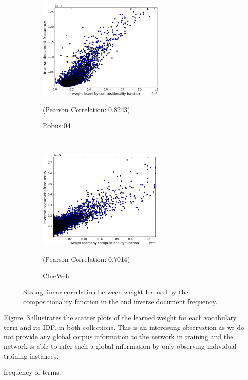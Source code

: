 \begin{figure}[!t]%
    \centering
    \begin{subfigure}[t]{0.45\textwidth}
        \centering
        \includegraphics[height=5cm]{03-part-02/chapter-04/figs_and_tables/plot_composionality_idf_scatter_robust.png}
        \caption{\label{fig:scatter_r}Robust04}{\scriptsize{(Pearson Correlation: 0.8243)}}
    \end{subfigure}%
    ~
    \begin{subfigure}[t]{0.45\textwidth}
        \centering
        \includegraphics[height=5cm]{03-part-02/chapter-04/figs_and_tables/plot_composionality_idf_scatter_clueweb.png}
        \caption{\label{fig:scatter_c}ClueWeb}{\scriptsize{(Pearson Correlation: 0.7014)}}
    \end{subfigure}%
    \caption{\label{fig:scatter}Strong linear correlation between weight learned by the compositionality function in the \feedthree and inverse document frequency.}
\end{figure}
%
Figure~\ref{fig:scatter} illustrates the scatter plots of the learned weight for each vocabulary term and its IDF, in both collections.
This is an interesting observation as we do not provide any global corpus information to the network in training and the network is able to infer such a global information by only observing individual training instances.

frequency of terms. 


